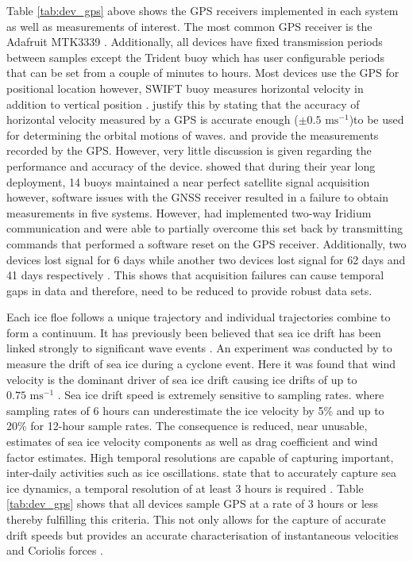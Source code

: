 Table \ref{tab:dev_gps} above shows the GPS receivers implemented in each system as well as measurements of interest. The most common GPS receiver is the Adafruit MTK3339 \cite{mtk3339}. Additionally, all devices have fixed transmission periods between samples except the Trident buoy which has user configurable periods that can be set from a couple of minutes to hours. Most devices use the GPS for positional location however, SWIFT buoy measures horizontal velocity in addition to vertical position \cite{thomson2012wave}.  \textcite{thomson2012wave} justify this by stating that the accuracy of horizontal velocity measured by a GPS is accurate enough ($\pm 0.5 \text{ ms}^{-1}$)to be used for determining the orbital motions of waves. \textcite{kohout2015device} and \textcite{rabault2019open} provide the measurements recorded by the GPS. However, very little discussion is given regarding the performance and accuracy of the device. \textcite{doble2017robust} showed that during their year long deployment, 14 buoys maintained a near perfect satellite signal acquisition however, software issues with the GNSS receiver resulted in a failure to obtain measurements in five systems. However, \textcite{doble2017robust} had implemented two-way Iridium communication and were able to partially overcome this set back by transmitting commands that performed a software reset on the GPS receiver. Additionally, two devices lost signal for 6 days while another two devices lost signal for 62 days and 41 days respectively \cite{doble2013wave}. This shows that acquisition failures can cause temporal gaps in data and therefore, need to be reduced to provide robust data sets.

Each ice floe follows a unique trajectory \cite{lepparanta2001sea}  and individual trajectories combine to form a continuum. It has previously been believed that sea ice drift has been linked strongly to significant wave events \cite{alberello2019drift}. An experiment was conducted by \textcite{alberello2019drift} to measure the drift of sea ice during a cyclone event. Here it was found that wind velocity is the dominant driver of sea ice drift \cite{alberello2019drift} causing ice drifts of up to $0.75\text{  ms}^{-1}$ \cite{alberello2019drift}. Sea ice drift speed is extremely sensitive to sampling rates. \cite{alberello2019drift} where sampling rates of 6 hours can underestimate the ice velocity by 5\% \cite{alberello2019drift} and up to 20\% for 12-hour sample rates. The consequence is reduced, near unusable, estimates of sea ice velocity components as well as drag coefficient and wind factor estimates. High temporal resolutions are capable of capturing important, inter-daily activities such as ice oscillations. \textcite{alberello2019drift} state that to accurately capture sea ice dynamics, a temporal resolution of at least 3 hours is required \cite{alberello2019drift}. Table \ref{tab:dev_gps} shows that all devices sample GPS at a rate of 3 hours or less thereby fulfilling this criteria. This not only allows for the capture of accurate drift speeds but provides an accurate characterisation of instantaneous velocities and Coriolis forces \cite{alberello2019drift}.
 
